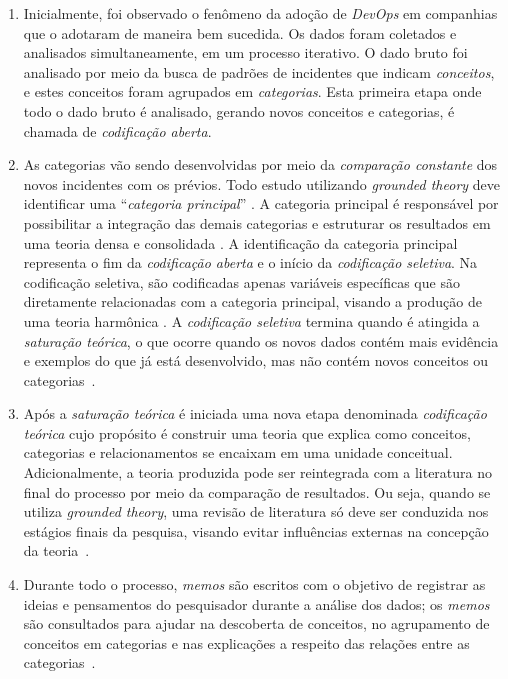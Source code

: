 \begin{enumerate}[label=(\Alph*)]

\item Inicialmente, foi observado o fenômeno da adoção de \textit{DevOps} em companhias que
o adotaram de maneira bem sucedida. Os dados foram coletados e
analisados simultaneamente, em um processo iterativo. O dado bruto foi
analisado por meio da busca de padrões de incidentes que indicam \emph{conceitos},
e estes conceitos foram agrupados em \emph{categorias}. Esta primeira etapa onde
todo o dado bruto é analisado, gerando novos conceitos e categorias, é chamada
de \emph{codificação aberta}.

\item As categorias vão sendo desenvolvidas por meio da \emph{comparação constante}
dos novos incidentes com os prévios. Todo estudo utilizando \textit{grounded theory}
deve identificar uma ``\emph{categoria principal}'' \cite{stol2016grounded}. A
categoria principal é responsável por possibilitar a integração das demais
categorias e estruturar os resultados em uma teoria densa e consolidada \cite{jantunen_using_gt_approach}.
A identificação da categoria principal representa o fim da \emph{codificação
aberta} e o início da \emph{codificação seletiva}. Na codificação seletiva,
são codificadas apenas variáveis específicas que são diretamente relacionadas
com a categoria principal, visando a produção de uma teoria harmônica \cite{using_gt_coleman,hoda_impact_inadequate}.
A \emph{codificação seletiva} termina quando é atingida a \emph{saturação
teórica}, o que ocorre quando os novos dados contém mais evidência e exemplos
do que já está desenvolvido, mas não contém novos conceitos ou categorias~\cite{glaser1967discovery}.

\item Após a \emph{saturação teórica} é iniciada uma nova etapa denominada
\emph{codificação teórica} cujo propósito é construir uma teoria que explica
como conceitos, categorias e relacionamentos se encaixam em uma unidade conceitual.
Adicionalmente, a teoria produzida pode ser reintegrada com a literatura no final
do processo por meio da comparação de resultados. Ou seja, quando se utiliza
{\it grounded theory}, uma revisão de literatura só deve ser conduzida nos
estágios finais da pesquisa, visando evitar influências externas na concepção
da teoria~\cite{reconciling_perspectives}.

\item Durante todo o processo, {\it memos} são escritos com o objetivo de
registrar as ideias e pensamentos do pesquisador durante a análise dos dados; os
{\it memos} são consultados para ajudar na descoberta de conceitos, no
agrupamento de conceitos em categorias e nas explicações a respeito das relações
entre as categorias~\cite{reconciling_perspectives}.

\end{enumerate}

